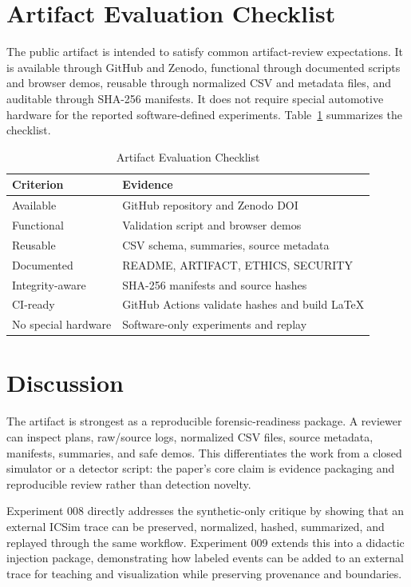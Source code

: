 \documentclass[conference]{IEEEtran}
\begin{document}
\section{Artifact Evaluation Checklist}
The public artifact is intended to satisfy common artifact-review expectations. It is available through GitHub and Zenodo, functional through documented scripts and browser demos, reusable through normalized CSV and metadata files, and auditable through SHA-256 manifests. It does not require special automotive hardware for the reported software-defined experiments. Table~\ref{tab:artifactcheck} summarizes the checklist.

\begin{table}[t]
\caption{Artifact Evaluation Checklist}
\label{tab:artifactcheck}
\centering
\footnotesize
\begin{tabular}{p{}p{}}
\toprule
Criterion & Evidence \\
\midrule
Available & GitHub repository and Zenodo DOI \\
Functional & Validation script and browser demos \\
Reusable & CSV schema, summaries, source metadata \\
Documented & README, ARTIFACT, ETHICS, SECURITY \\
Integrity-aware & SHA-256 manifests and source hashes \\
CI-ready & GitHub Actions validate hashes and build LaTeX \\
No special hardware & Software-only experiments and replay \\
\bottomrule
\end{tabular}
\end{table}

\section{Discussion}
The artifact is strongest as a reproducible forensic-readiness package. A reviewer can inspect plans, raw/source logs, normalized CSV files, source metadata, manifests, summaries, and safe demos. This differentiates the work from a closed simulator or a detector script: the paper's core claim is evidence packaging and reproducible review rather than detection novelty.

Experiment 008 directly addresses the synthetic-only critique by showing that an external ICSim trace can be preserved, normalized, hashed, summarized, and replayed through the same workflow. Experiment 009 extends this into a didactic injection package, demonstrating how labeled events can be added to an external trace for teaching and visualization while preserving provenance and boundaries.
\end{document}
